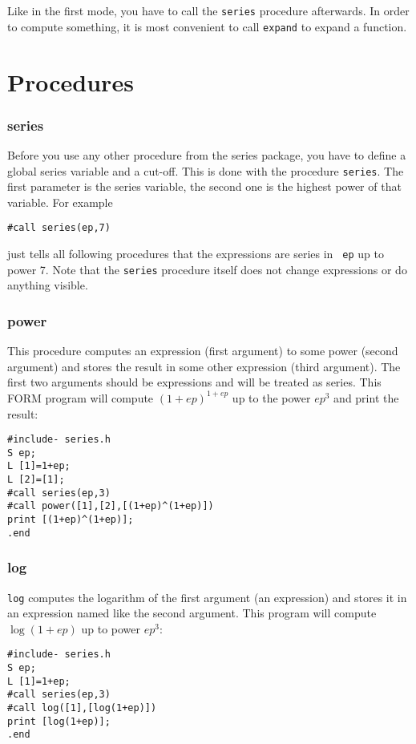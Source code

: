 \documentclass{article}
\begin{document}
Like in the first mode, you have to call the {\tt series} procedure
afterwards. In order to compute something, it is most convenient to call
{\tt expand} to expand a function.

\section{Procedures}
\label{sec:proc}


\subsubsection{series}
\label{sec:series}

Before you use any other procedure from the series package, you have to
define a global series variable and a cut-off. This is done with the
procedure {\tt series}. The first parameter is the series variable, the
second one is the highest power of that variable. For example
\begin{verbatim}
#call series(ep,7)
\end{verbatim}
just tells all following procedures that the expressions are series in {\tt
  ep} up to power 7. Note that the {\tt series} procedure itself does
not change expressions or do anything visible.

\subsubsection{power}
\label{sec:pow}

This procedure computes an expression (first argument) to some power
(second argument) and stores the result in some other expression (third
argument). The first two arguments should be expressions and will be
treated as series. This FORM program will compute $(1+ep)^{1+ep}$ up to
the power $ep^3$ and print the result:
\begin{verbatim}
#include- series.h
S ep;
L [1]=1+ep;
L [2]=[1];
#call series(ep,3)
#call power([1],[2],[(1+ep)^(1+ep)])
print [(1+ep)^(1+ep)];
.end
\end{verbatim}


\subsubsection{log}
\label{sec:log}

{\tt log} computes the logarithm of the first argument (an
expression) and stores it in an expression named like the second
argument. This program will compute $\log (1+ep)$ up to power $ep^3$:
\begin{verbatim}
#include- series.h
S ep;
L [1]=1+ep;
#call series(ep,3)
#call log([1],[log(1+ep)])
print [log(1+ep)];
.end
\end{verbatim}
\end{document}
